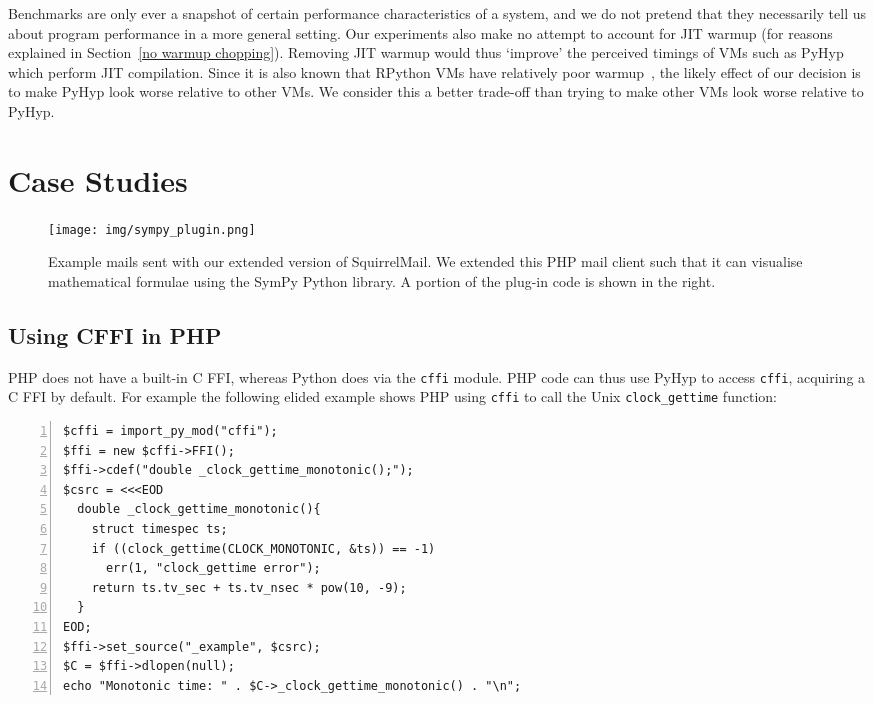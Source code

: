 \documentclass[a4paper,UKenglish]{lipics-v2016}
\newcommand{\ourvm}{PyHyp\xspace}
\begin{document}
Benchmarks are only ever a snapshot of certain performance characteristics of a
system, and we do not pretend that they necessarily tell us about program
performance in a more general setting. Our experiments also make no attempt to
account for JIT warmup (for reasons explained in Section~\ref{no warmup
chopping}). Removing JIT warmup would thus `improve' the perceived timings of
VMs such as \ourvm which perform JIT compilation. Since it is also known that
RPython VMs have relatively poor warmup~\cite{bolz14impact}, the likely effect of
our decision is to make \ourvm look worse relative to other VMs. We consider
this a better trade-off than trying to make other VMs look worse relative to
\ourvm.


\section{Case Studies}
\label{sec:case studies}

\begin{figure*}[t]
\centering
\texttt{[image: img/sympy\_plugin.png]}
\caption{Example mails sent with our extended version of SquirrelMail. We
extended this PHP mail client such that it can visualise mathematical formulae
using the SymPy Python library. A portion of the plug-in code is shown in the
right.}

\label{fig:sympyexample}
\end{figure*}

\subsection{Using CFFI in PHP}

PHP does not have a built-in C FFI, whereas Python does via the \texttt{cffi}
module. PHP code can thus use \ourvm to access \texttt{cffi},
acquiring a C FFI by default. For example the following elided example
shows PHP using \texttt{cffi} to call the Unix \texttt{clock\_gettime}
function:
\begin{lstlisting}[numbers=left]
$cffi = import_py_mod("cffi");
$ffi = new $cffi->FFI();
$ffi->cdef("double _clock_gettime_monotonic();");
$csrc = <<<EOD
  double _clock_gettime_monotonic(){
    struct timespec ts;
    if ((clock_gettime(CLOCK_MONOTONIC, &ts)) == -1)
      err(1, "clock_gettime error");
    return ts.tv_sec + ts.tv_nsec * pow(10, -9);
  }
EOD;
$ffi->set_source("_example", $csrc);
$C = $ffi->dlopen(null);
echo "Monotonic time: " . $C->_clock_gettime_monotonic() . "\n";
\end{lstlisting}
\end{document}
